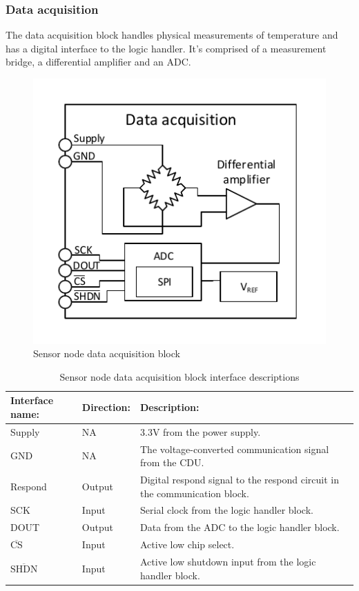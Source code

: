 \subsubsection{Data acquisition}

The data acquisition block handles physical measurements of temperature and has a digital interface to the logic handler. It's comprised of a measurement bridge, a differential amplifier and an ADC.

\begin{figure}[H]
	\centering
	\includegraphics[width=.5\textwidth]{billeder/data_aqcuisition_sn}
	\caption{Sensor node data acquisition block}
	\label{fig:sn_data_acquisition}
\end{figure}

\begin{table}[H]
	\centering
	\begin{tabular}{|p{3cm} |p{2cm} | p{8cm}| }
		\hline
		Interface name: 			& Direction: 	& Description: \\ \hline
		Supply						& NA			& 3.3V from the power supply. \\ \hline
		GND							& NA			& The voltage-converted communication signal from the CDU.\\ \hline
		Respond		  				& Output		& Digital respond signal to the respond circuit in the communication block. \\ \hline
		SCK							& Input			& Serial clock from the logic handler block.\\\hline
		DOUT						& Output		& Data from the ADC to the logic handler block.\\\hline
		$\overline{\text{CS}}$		& Input			& Active low chip select.\\\hline
		$\overline{\text{SHDN}}$	& Input			& Active low shutdown input from the logic handler block.\\\hline
	\end{tabular}
	\caption{Sensor node data acquisition block interface descriptions}
\end{table}


